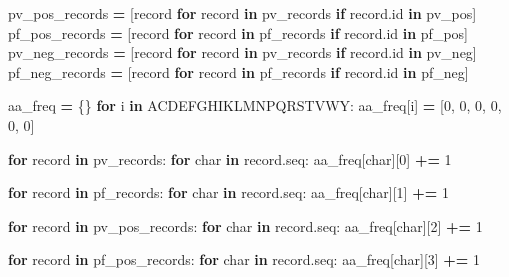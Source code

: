\documentclass[
  11pt,
  oneside]{book}
\newenvironment{Shaded}{\begin{snugshade}}{\end{snugshade}}
\newcommand{\BuiltInTok}[1]{#1}
\newcommand{\ControlFlowTok}[1]{\textcolor[rgb]{0.13,0.29,0.53}{\textbf{#1}}}
\newcommand{\DecValTok}[1]{\textcolor[rgb]{0.00,0.00,0.81}{#1}}
\newcommand{\KeywordTok}[1]{\textcolor[rgb]{0.13,0.29,0.53}{\textbf{#1}}}
\newcommand{\NormalTok}[1]{#1}
\newcommand{\OperatorTok}[1]{\textcolor[rgb]{0.81,0.36,0.00}{\textbf{#1}}}
\newcommand{\StringTok}[1]{\textcolor[rgb]{0.31,0.60,0.02}{#1}}
\begin{document}
\begin{Shaded}
\begin{Highlighting}[]
\NormalTok{pv\_pos\_records }\OperatorTok{=}\NormalTok{ [record }\ControlFlowTok{for}\NormalTok{ record }\KeywordTok{in}\NormalTok{ pv\_records }\ControlFlowTok{if}\NormalTok{ record.}\BuiltInTok{id} \KeywordTok{in}\NormalTok{ pv\_pos]}
\NormalTok{pf\_pos\_records }\OperatorTok{=}\NormalTok{ [record }\ControlFlowTok{for}\NormalTok{ record }\KeywordTok{in}\NormalTok{ pf\_records }\ControlFlowTok{if}\NormalTok{ record.}\BuiltInTok{id} \KeywordTok{in}\NormalTok{ pf\_pos]}
\NormalTok{pv\_neg\_records }\OperatorTok{=}\NormalTok{ [record }\ControlFlowTok{for}\NormalTok{ record }\KeywordTok{in}\NormalTok{ pv\_records }\ControlFlowTok{if}\NormalTok{ record.}\BuiltInTok{id} \KeywordTok{in}\NormalTok{ pv\_neg]}
\NormalTok{pf\_neg\_records }\OperatorTok{=}\NormalTok{ [record }\ControlFlowTok{for}\NormalTok{ record }\KeywordTok{in}\NormalTok{ pf\_records }\ControlFlowTok{if}\NormalTok{ record.}\BuiltInTok{id} \KeywordTok{in}\NormalTok{ pf\_neg]}

\NormalTok{aa\_freq }\OperatorTok{=}\NormalTok{ \{\}}
\ControlFlowTok{for}\NormalTok{ i }\KeywordTok{in} \StringTok{\textquotesingle{}ACDEFGHIKLMNPQRSTVWY\textquotesingle{}}\NormalTok{:}
\NormalTok{    aa\_freq[i] }\OperatorTok{=}\NormalTok{ [}\DecValTok{0}\NormalTok{, }\DecValTok{0}\NormalTok{, }\DecValTok{0}\NormalTok{, }\DecValTok{0}\NormalTok{, }\DecValTok{0}\NormalTok{, }\DecValTok{0}\NormalTok{]}
    
\ControlFlowTok{for}\NormalTok{ record }\KeywordTok{in}\NormalTok{ pv\_records:}
    \ControlFlowTok{for}\NormalTok{ char }\KeywordTok{in}\NormalTok{ record.seq:}
\NormalTok{        aa\_freq[char][}\DecValTok{0}\NormalTok{] }\OperatorTok{+=} \DecValTok{1}

\ControlFlowTok{for}\NormalTok{ record }\KeywordTok{in}\NormalTok{ pf\_records:}
    \ControlFlowTok{for}\NormalTok{ char }\KeywordTok{in}\NormalTok{ record.seq:}
\NormalTok{        aa\_freq[char][}\DecValTok{1}\NormalTok{] }\OperatorTok{+=} \DecValTok{1}

\ControlFlowTok{for}\NormalTok{ record }\KeywordTok{in}\NormalTok{ pv\_pos\_records:}
    \ControlFlowTok{for}\NormalTok{ char }\KeywordTok{in}\NormalTok{ record.seq:}
\NormalTok{        aa\_freq[char][}\DecValTok{2}\NormalTok{] }\OperatorTok{+=} \DecValTok{1}

\ControlFlowTok{for}\NormalTok{ record }\KeywordTok{in}\NormalTok{ pf\_pos\_records:}
    \ControlFlowTok{for}\NormalTok{ char }\KeywordTok{in}\NormalTok{ record.seq:}
\NormalTok{        aa\_freq[char][}\DecValTok{3}\NormalTok{] }\OperatorTok{+=} \DecValTok{1}


\end{Highlighting}
\end{Shaded}
\end{document}
